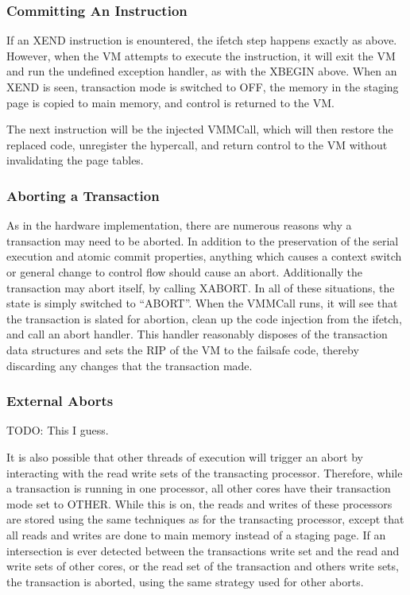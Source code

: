 \documentclass{acm_proc_article-sp}
\begin{document}
\subsubsection{Committing An Instruction}

If an XEND instruction is enountered, the ifetch step happens exactly as above.
However, when the VM attempts to execute the instruction, it will exit the VM
and run the undefined exception handler, as with the XBEGIN above. When an XEND
is seen, transaction mode is switched to OFF, the memory in the staging page is
copied to main memory, and control is returned to the VM.

The next instruction will be the injected VMMCall, which will then restore the
replaced code, unregister the hypercall, and return control to the VM without
invalidating the page tables.

\subsubsection{Aborting a Transaction}

As in the hardware implementation, there are numerous reasons why a transaction
may need to be aborted. In addition to the preservation of the serial execution
and atomic commit properties, anything which causes a context switch or general
change to control flow should cause an abort. Additionally the transaction may
abort itself, by calling XABORT. In all of these situations, the state is 
simply switched to ``ABORT''. When the VMMCall runs, it will see that the 
transaction is slated for abortion, clean up the code injection from the ifetch,
and call an abort handler. This handler reasonably disposes of the transaction
data structures and sets the RIP of the VM to the failsafe code, thereby
discarding any changes that the transaction made. 

\subsubsection{External Aborts}

TODO: This I guess.

It is also possible that other threads of execution will trigger an abort by
interacting with the read write sets of the transacting processor. Therefore,
while a transaction is running in one processor, all other cores have their
transaction mode set to OTHER. While this is on, the reads and writes of these
processors are stored using the same techniques as for the transacting
processor, except that all reads and writes are done to main memory instead of
a staging page. If an intersection is ever detected between the transactions
write set and the read and write sets of other cores, or the read set of the
transaction and others write sets, the transaction is aborted, using the same
strategy used for other aborts.  
\end{document}
